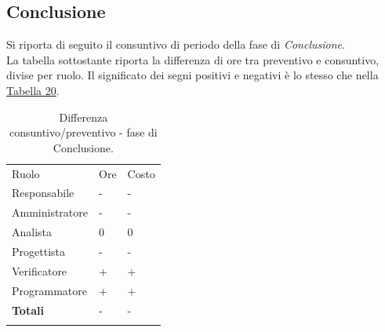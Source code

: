 \documentclass[a4paper]{article}
\begin{document}
			\subsection{Conclusione}
                Si riporta di seguito il consuntivo di periodo della fase di \emph{Conclusione}. \\
                La tabella sottostante riporta la differenza di ore tra preventivo e consuntivo, divise per ruolo. Il significato dei segni
                positivi e negativi è lo stesso che nella \hyperref[DCSceltaCapitolato]{Tabella 20}.
                \begin{table}[H]
					\begin{tabularx}{\textwidth}{Y Y Y}
						Ruolo & Ore & Costo \\
						Responsabile & - & - \\
						Amministratore & - & - \\
						Analista & 0 & 0 \\
						Progettista & - & - \\
						Verificatore & + & + \\
						Programmatore & + & + \\
						\textbf{Totali} & - & - \\
					\end{tabularx}
					\caption{Differenza consuntivo/preventivo - fase di Conclusione. } 
					\label{ConsuntivoIncremento}
				\end{table}
				
\end{document}
